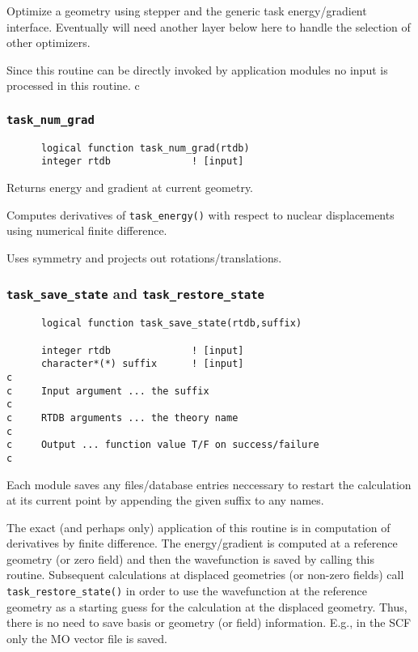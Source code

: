 Optimize a geometry using stepper and the generic 
task energy/gradient interface.  Eventually will need another
layer below here to handle the selection of other optimizers.
     
Since this routine can be directly invoked by application modules
no input is processed in this routine.
c     
\subsubsection{{\tt task\_num\_grad}}

\begin{verbatim}
      logical function task_num_grad(rtdb)
      integer rtdb              ! [input] 
\end{verbatim}

Returns energy and gradient at current geometry.

Computes derivatives of \verb+task_energy()+ with respect to nuclear displacements
using numerical finite difference.

Uses symmetry and projects out rotations/translations. 


\subsubsection{{\tt task\_save\_state} and {\tt task\_restore\_state}}

\begin{verbatim}
      logical function task_save_state(rtdb,suffix)

      integer rtdb              ! [input]
      character*(*) suffix      ! [input]
c
c     Input argument ... the suffix
c     
c     RTDB arguments ... the theory name
c     
c     Output ... function value T/F on success/failure
c     
\end{verbatim}
     
Each module saves any files/database entries neccessary
to restart the calculation at its current point by appending the
given suffix to any names.
     
The exact (and perhaps only) application of this routine is in
computation of derivatives by finite difference.  The energy/gradient
is computed at a reference geometry (or zero field) and then
the wavefunction is saved by calling this routine.  Subsequent
calculations at displaced geometries (or non-zero fields) call
\verb+task_restore_state()+ in order to use the wavefunction at the
reference geometry as a starting guess for the calculation
at the displaced geometry.  Thus, there is no need to save basis
or geometry (or field) information.  E.g., in the SCF only the
MO vector file is saved.
     

